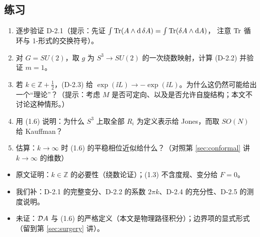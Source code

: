 \subsection{练习}
\begin{enumerate}[leftmargin=*]
  \item 逐步验证 D-2.1（提示：先证 $\int\operatorname{Tr}(A\wedge\mathrm{d}\,\delta A)=\int\operatorname{Tr}(\delta A\wedge\mathrm{d} A)$，
        注意 $\operatorname{Tr}$ 循环与 1-形式的交换符号）。
  \item 对 $G=SU(2)$，取 $g$ 为 $S^3\to SU(2)$ 的一次绕数映射，计算 (D-2.2) 并验证 $m=1$。
  \item 若 $k\in\mathbb Z+\tfrac12$，(D-2.3) 给 $\exp(\ii L)\to-\exp(\ii L)$。为什么这仍然可能给出
        一个“理论”？（提示：考虑 $M$ 是否可定向、以及是否允许自旋结构；本文不讨论这种情形。）
  \item 用 (1.6) 说明：为什么 $S^3$ 上取全部 $R_i$ 为定义表示给 Jones，而取 $SO(N)$ 给 Kauffman？
  \item 估算：$k\to\infty$ 时 (1.6) 的平稳相位近似给什么？（对照第 \ref{sec:conformal} 讲 $k\to\infty$ 的维数）
\end{enumerate}

\begin{boundary}
\begin{itemize}
  \item 原文证明：$k\in\mathbb Z$ 的必要性（绕数论证）；(1.3) 不含度规、变分给 $F=0$。
  \item 我们补：D-2.1 的完整变分、D-2.2 的系数 $2\pi k$、D-2.4 的充分性、D-2.5 的测度说明。
  \item 未证：$\mathcal{D} A$ 与 (1.6) 的严格定义（本文是物理路径积分）；边界项的显式形式（留到第 \ref{sec:surgery} 讲）。
\end{itemize}
\end{boundary}
